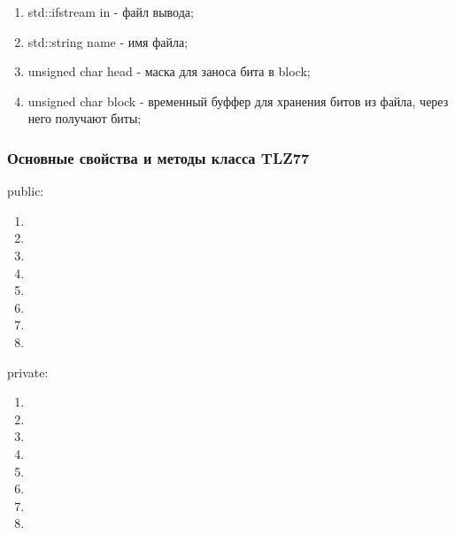 \documentclass[12pt]{article}
\begin{document}
\begin{enumerate}
	\item std::ifstream in - файл вывода;
    \item std::string name - имя файла;
    \item unsigned char head - маска для заноса бита в block;
    \item unsigned char block - временный буффер для хранения битов из файла, через него получают биты;
\end{enumerate}

\subsubsection*{Основные свойства и методы класса TLZ77}%
\noindent
public:

\begin{enumerate}
	\item 
	\item 
	\item 
	\item 
	\item 
	\item 
	\item 
	\item 
\end{enumerate}
\noindent
private:

\begin{enumerate}
	\item 
	\item 
	\item 
	\item 
	\item 
	\item 
	\item 
	\item 
\end{enumerate}
\end{document}
